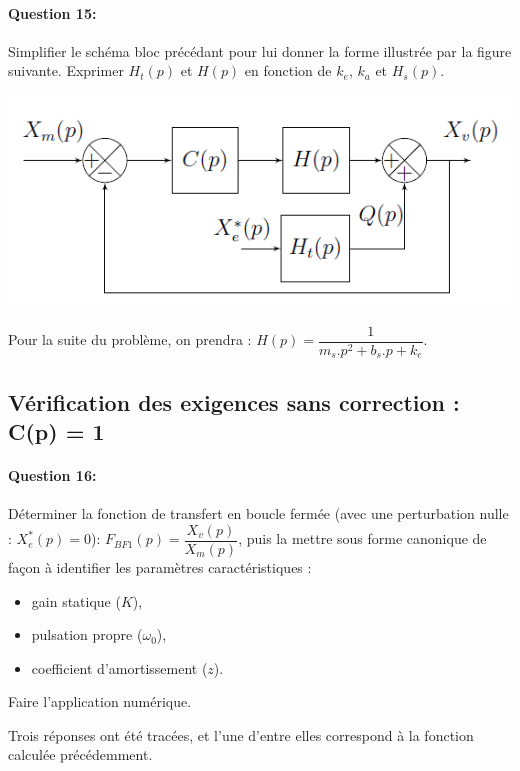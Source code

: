 \paragraph{Question 15:} Simplifier le schéma bloc précédant pour lui donner la forme illustrée par la figure suivante. Exprimer $H_t(p)$ et $H(p)$ en fonction de $k_e$, $k_a$ et $H_s(p)$.

\begin{center}
 \includegraphics[width=0.6\linewidth]{img/Figure19}
\end{center}

Pour la suite du problème, on prendra : $H(p)=\dfrac{1}{m_s.p^2+b_s.p+k_e}$.

\subsection{Vérification des exigences sans correction : C(p) = 1}

\paragraph{Question 16:} Déterminer la fonction de transfert en boucle fermée (avec une perturbation nulle :
$X^*_e(p)=0$): $F_{BF1}(p)=\dfrac{X_v(p)}{X_m(p)}$, puis la mettre sous forme canonique de façon à identifier
les paramètres caractéristiques :
\begin{itemize}
 \item gain statique ($K$),
 \item pulsation propre ($\omega_0$),
 \item coefficient d'amortissement ($z$). 
\end{itemize}

Faire l'application numérique.

Trois réponses ont été tracées, et l'une d'entre elles correspond à la fonction calculée précédemment.

